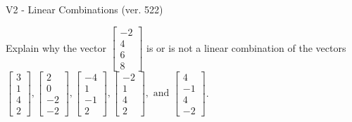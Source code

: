 \begin{exercise}
  \begin{exerciseTitle}V2 - Linear Combinations (ver. 522)\end{exerciseTitle}
  \begin{exerciseStatement}
    Explain why the vector \(\left[\begin{array}{c}
-2 \\
4 \\
6 \\
8
\end{array}\right]\)  is or is not a linear 
	combination of the vectors \(\left[\begin{array}{c}
3 \\
1 \\
4 \\
2
\end{array}\right] , \left[\begin{array}{c}
2 \\
0 \\
-2 \\
-2
\end{array}\right] , \left[\begin{array}{c}
-4 \\
1 \\
-1 \\
2
\end{array}\right] , \left[\begin{array}{c}
-2 \\
1 \\
4 \\
2
\end{array}\right] , \text{ and } \left[\begin{array}{c}
4 \\
-1 \\
4 \\
-2
\end{array}\right]\).
	



\end{exerciseStatement}
\end{exercise}
